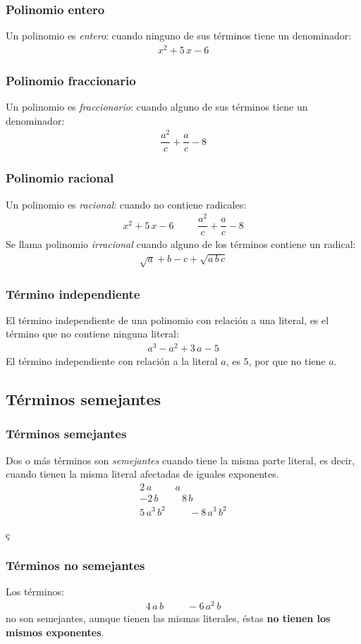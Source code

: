 \begin{frame}
\frametitle{Polinomio entero}
Un polinomio es \emph{entero}: cuando ninguno de sus términos tiene un denominador:
\pause
\begin{align*}
x^{2} + 5 \, x - 6
\end{align*}
\end{frame}
\begin{frame}
\frametitle{Polinomio fraccionario}
Un polinomio es \emph{fraccionario}: cuando alguno de sus términos tiene un denominador:
\pause
\begin{align*}
\dfrac{a^{2}}{c} + \dfrac{a}{c} - 8
\end{align*}
\end{frame}
\begin{frame}
\frametitle{Polinomio racional}
Un polinomio es \emph{racional}: cuando no contiene radicales:
\pause
\begin{align*}
x^{2} + 5 \, x - 6 \hspace{1cm} \dfrac{a^{2}}{c} + \dfrac{a}{c} - 8
\end{align*}
\pause
Se llama polinomio \emph{irracional} cuando alguno de los términos contiene un radical:
\pause
\begin{align*}
\sqrt{a} + b - c + \sqrt{a \, b \, c}
\end{align*}
\end{frame}
\begin{frame}
\frametitle{Término independiente}
El término independiente de una polinomio con relación a una literal, es el término que no contiene ninguna literal:
\pause
\begin{align*}
a^{3} - a^{2} + 3 \, a - 5
\end{align*}
\pause
El término independiente con relación a la literal $a$, es $5$, por que no tiene $a$.
\end{frame}

\subsection{Términos semejantes}

\begin{frame}
\frametitle{Términos semejantes}
Dos o más términos son \emph{semejantes} cuando tiene la misma parte literal, es decir, cuando tienen la misma literal afectadas de iguales exponentes.
\pause
\begin{align*}
2 \, a \hspace{1cm} a \\
- 2 \, b \hspace{1cm} 8 \, b \\
5 \, a^{3} \, b^{2} \hspace{1cm} -8 \, a^{3} \, b^{2}
\end{align*}
\end{frame}ç
\begin{frame}
\frametitle{Términos no semejantes}
Los términos:
\begin{align*}
4 \, a \, b \hspace{1cm} - 6 \, a^{2} \, b
\end{align*}
no son semejantes, \pause aunque tienen las mismas literales, éstas \textbf{no tienen los mismos exponentes}.
\end{frame}
